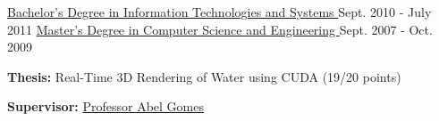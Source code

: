 \begin{cventries}
  \cventry
    {\href{https://www.ubi.pt/en/course/64}{Bachelor's Degree in Information Technologies and Systems %
    }} %
    {} %
    {} %
    {Sept. 2010 - July 2011} %
    {
    }
  \vspace{-0.7cm}  
  \cventry
    {\href{https://www.ubi.pt/en/course/804}{Master's Degree in Computer Science and Engineering %
    }} %
    {} %
    {} %
    {Sept. 2007 - Oct. 2009} %
    {
      \begin{cvitems} %
        \item[] {\textbf{Thesis:} Real-Time 3D Rendering of Water using CUDA (19/20 points)}
        \item[] {\textbf{Supervisor:} \href{http://www.di.ubi.pt/~agomes/}{Professor Abel Gomes}}

\end{cvitems}}
\end{cventries}
